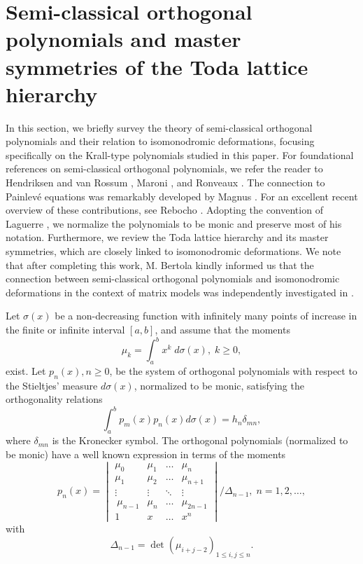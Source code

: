 \documentclass[10pt, reqno]{amsart}
\numberwithin{equation}{section}
\numberwithin{equation}{section}
\begin{document}
\section{Semi-classical orthogonal polynomials and master symmetries of the Toda lattice hierarchy}
In this section, we briefly survey the theory of semi-classical orthogonal polynomials and their relation to isomonodromic deformations, focusing specifically on the Krall-type polynomials studied in this paper. For foundational references on semi-classical orthogonal polynomials, we refer the reader to Hendriksen and van Rossum \cite{HV}, Maroni \cite{Mar}, and Ronveaux \cite{Ro}. The connection to Painlevé equations was remarkably developed by Magnus \cite{M}. For an excellent recent overview of these contributions, see Rebocho \cite{Re}. Adopting the convention of Laguerre \cite{La}, we normalize the polynomials to be monic and preserve most of his notation. Furthermore, we review the Toda lattice hierarchy and its master symmetries, which are closely linked to isomonodromic deformations. We note that after completing this work, M. Bertola kindly informed us that the connection between semi-classical orthogonal polynomials and isomonodromic deformations in the context of matrix models was independently investigated in \cite{BEH}.

Let $\sigma(x)$ be a non-decreasing function with infinitely many points of increase in the finite or infinite interval $[a,b]$, and assume that the moments 
\begin{equation*}
\mu_k=\int_a^b x^k\;d\sigma(x),\; k\geq 0, 
\end{equation*}
exist. Let $p_n(x), n\geq 0$,  be the system of orthogonal polynomials with respect to the Stieltjes' measure $d\sigma(x)$, normalized to be monic, satisfying the orthogonality relations
\begin{equation} 
\int_a^b p_m(x) p_n(x)d\sigma(x)=h_n\delta_{mn},\label{h}
\end{equation}
where $\delta_{mn}$ is the Kronecker symbol. The orthogonal polynomials (normalized to be monic) have a well known expression in terms of the moments
\begin{equation} 
p_n(x)=\begin{vmatrix}\mu_0&\mu_1&\ldots&\mu_{n}\\
\mu_1&\mu_2&\ldots&\mu_{n+1}\\
\vdots&\vdots&\ddots&\vdots\\\
\mu_{n-1}&\mu_n&\ldots &\mu_{2n-1}\\
1& x&\ldots &x^n\end{vmatrix}/\Delta_{n-1},\;n=1,2,\ldots, \label{opm}
\end{equation}
with
\begin{equation*}
\Delta_{n-1}=\det(\mu_{i+j-2})_{1\leq i,j\leq n}.
\end{equation*}
\end{document}
